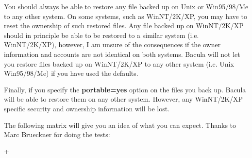 You should always be able to restore any file backed up on Unix or Win95/98/Me
to any other system. On some systems, such as WinNT/2K/XP, you may have to
reset the ownership of such restored files. Any file backed up on WinNT/2K/XP
should in principle be able to be restored to a similar system (i.e.
WinNT/2K/XP), however, I am unsure of the consequences if the owner
information and accounts are not identical on both systems. Bacula will not
let you restore files backed up on WinNT/2K/XP to any other system (i.e. Unix
Win95/98/Me) if you have used the defaults. 

Finally, if you specify the {\bf portable=yes} option on the files you back
up. Bacula will be able to restore them on any other system. However, any
WinNT/2K/XP specific security and ownership information will be lost. 

The following matrix will give you an idea of what you can expect. Thanks to
Marc Brueckner for doing the tests: 

+ 

